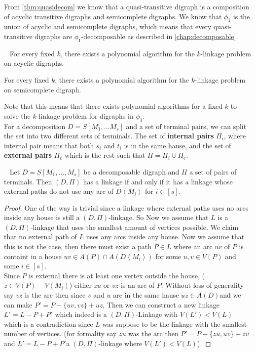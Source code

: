 From \autoref{thm:quasidecom} we know that a quasi-transitive digraph is a composition of acyclic transitive digraphs and semicomplete digraphs.
We know that $\phi_1$ is the union of acyclic and semicomplete digraphs, which means that every quasi-transitive digraphs are $\phi_1$-decomposable as described in \autoref{chap:decomposable}. 
\begin{thm}~\cite{bangJGT85}
    For every fixed $k$, there exists a polynomial algorithm for the $k$-linkage problem on acyclic digraphs.
    \label{thm:acyclicklink}
\end{thm}
\begin{thm}
    For every fixed $k$, there exists a polynomial algorithm for the $k$-linkage problem on semicomplete digraph.
    \label{thm:semiklink}
\end{thm}
Note that this means that there exists polynomial algorithms for a fixed $k$ to solve the $k$-linkage problem for digraphs in $\phi_1$.\\
For a decomposition $D=S[M_1,\dots M_s]$ and a set of terminal pairs, we can split the set into two different sets of terminals. 
The set of \textbf{internal pairs} $\Pi_i$, where internal pair means that both $s_i$ and $t_i$ is in the same hause, and the set of \textbf{external pairs} $\Pi_e$ which is the rest such that $\Pi=\Pi_i \cup \Pi_e$.\\
\begin{lemma}~\cite{bangJGT85}
    Let $D=S[M_1,\dots ,M_s]$ be a decomposable digraph and $\Pi$ a set of pairs of terminals. Then $(D,\Pi)$ has a linkage if and only if it has a linkage whose external paths do not use any arc of $D\left<M_i\right>$ for $i\in [s]$.
\end{lemma}
\begin{proof}
    One of the way is trivial since a linkage where external paths uses no arcs inside any house is still a $(D,\Pi)$-linkage.
    So Now we assume that $L$ is a $(D,\Pi)$-linkage that uses the smallest amount of vertices possible. 
    We claim that no external path of $L$ uses any arcs inside any house. 
    Now we assume that this is not the case, then there must exist a path $P\in L$ where an arc $uv$ of $P$ is containt in a house $uv\in A(P)\cap A(D\left<M_i\right>)$ for some $u,v\in V(P)$ and some $i\in [s]$.\\
    Since $P$ is external there is at least one vertex outside the house, ($z\in V(P)-V(M_i)$) either $zu$ or $vz$ is an arc of $P$.
    Without loss of generality say $vz$ is the arc then since $v$ and $u$ are in the same hause $uz\in A(D)$and we can make $P'=P-\lbrace uv,vz\rbrace + uz$, Then we can construct a new linkage $L'=L-P+P'$ which indeed is a $(D,\Pi)$-Linkage with $V(L')<V(L)$ which is a contradiction since $L$ was suppose to be the linkage with the smallest number of vertices. 
    (for formality say $zu$ was the arc then $P'=P-\lbrace zu,uv\rbrace +zv$ and $L'=L-P+P'$a $(D,\Pi)$-linkage where $V(L')<V(L)$).
\end{proof}
